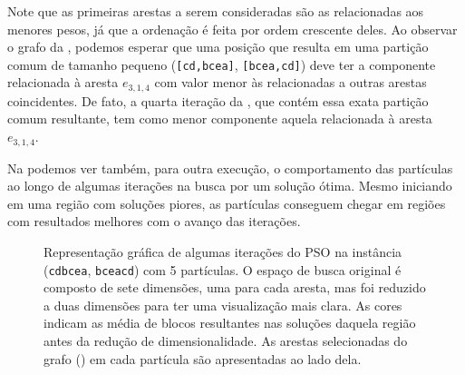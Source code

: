     \newpage

    Note que as primeiras arestas a serem consideradas são as relacionadas aos menores pesos, já que a ordenação é feita por ordem crescente deles. Ao observar o grafo da , podemos esperar que uma posição que resulta em uma partição comum de tamanho pequeno (\texttt{[cd,bcea]}, \texttt{[bcea,cd]}) deve ter a componente relacionada à aresta $e_{3,1,4}$ com valor menor às relacionadas a outras arestas coincidentes. De fato, a quarta iteração da , que contém essa exata partição comum resultante, tem como menor componente aquela relacionada à aresta $e_{3,1,4}$.

    Na  podemos ver também, para outra execução, o comportamento das partículas ao longo de algumas iterações na busca por um solução ótima. Mesmo iniciando em uma região com soluções piores, as partículas conseguem chegar em regiões com resultados melhores com o avanço das iterações.

    \begin{figure}[htb]
        \centering
        \newcommand{\mathdefault}[1][]{}


        \caption{Representação gráfica de algumas iterações do PSO na instância (\texttt{cdbcea}, \texttt{bceacd}) com 5 partículas. O espaço de busca original é composto de sete dimensões, uma para cada aresta, mas foi reduzido a duas dimensões para ter uma visualização mais clara. As cores indicam as média de blocos resultantes nas soluções daquela região antes da redução de dimensionalidade. As arestas selecionadas do grafo () em cada partícula são apresentadas ao lado dela.}
        \label{fig:pso-iter-example}
    \end{figure}
